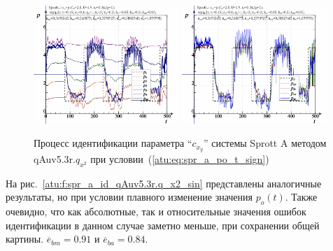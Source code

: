 \begin{figure}[h!]
  \centerline{
    \includegraphics[width=0.49\textwidth]{p/cha/spr_a/qAuv5.3r/sprott_a_qAuv5_3r_qx2-p_t_pi_sign.png}
    \hfill
    \includegraphics[width=0.49\textwidth]{p/cha/spr_a/qAuv5.3r/sprott_a_qAuv5_3r_qx2-p_t_pz_sign.png}
  }
  \caption{Процесс идентификации параметра ``$c_{x_y}$'' системы Sprott A методом qAuv5.3r.$q_{x^2}$ при условии~(\ref{atu:eq:spr_a_po_t_sign})}
  \label{atu:f:spr_a_id_qAuv5.3r.q_x2_sign}
\end{figure}

На рис.~\ref{atu:f:spr_a_id_qAuv5.3r.q_x2_sin} представлены аналогичные результаты,
но при условии плавного изменение значения $p_o(t)$. Также очевидно, что
как абсолютные, так и относительные значения ошибок идентификации в данном случае заметно
меньше, при сохранении общей картины.
$\overline{e}_{bm}=0.91$
и
$\overline{e}_{ba}=0.84$.

